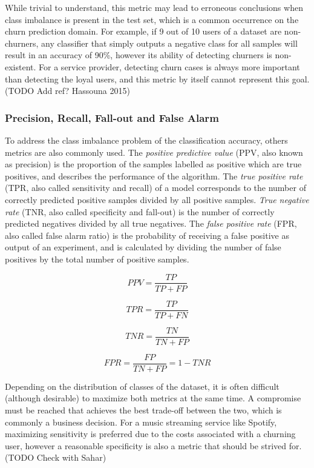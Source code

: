 \documentclass{kththesis}
\begin{document}
While trivial to understand, this metric may lead to erroneous conclusions when class imbalance is present in the test set, which is a common occurrence on the churn prediction domain. For example, if 9 out of 10 users of a dataset are non-churners, any classifier that simply outputs a negative class for all samples will result in an accuracy of 90\%, however its ability of detecting churners is non-existent. For a service provider, detecting churn cases is always more important than detecting the loyal users, and this metric by itself cannot represent this goal. (TODO Add ref? Hassouna 2015)

\subsubsection{Precision, Recall, Fall-out and False Alarm}

To address the class imbalance problem of the classification accuracy, others metrics are also commonly used. The \emph{positive predictive value} (PPV, also known as precision) is the proportion of the samples labelled as positive which are true positives, and describes the performance of the algorithm. The \emph{true positive rate} (TPR, also called sensitivity and recall) of a model corresponds to the number of correctly predicted positive samples divided by all positive samples. \emph{True negative rate} (TNR, also called specificity and fall-out) is the number of correctly predicted negatives divided by all true negatives. The \emph{false positive rate} (FPR, also called false alarm ratio) is the probability of receiving a false positive as output of an experiment, and is calculated by dividing the number of false positives by the total number of positive samples.

\begin{equation}
PPV = \frac{TP}{TP + FP}
\end{equation}

\begin{equation}
TPR = \frac{TP}{TP + FN}
\end{equation}

\begin{equation}
TNR = \frac{TN}{TN + FP}
\end{equation}

\begin{equation}
FPR = \frac{FP}{TN + FP} = 1 - TNR
\end{equation}

Depending on the distribution of classes of the dataset, it is often difficult (although desirable) to maximize both metrics at the same time. A compromise must be reached that achieves the best trade-off between the two, which is commonly a business decision. For a music streaming service like Spotify, maximizing sensitivity is preferred due to the costs associated with a churning user, however a reasonable specificity is also a metric that should be strived for. (TODO Check with Sahar)
\end{document}
